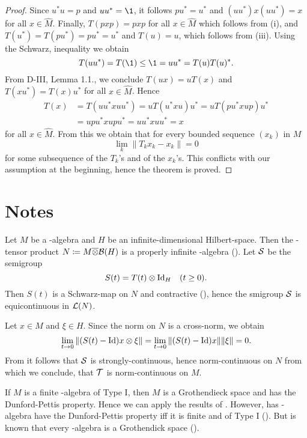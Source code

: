 \begin{proof}
Since $u^{*}u = p$ and $uu^{*} = \1$, it follows $pu^{*} = u^{*}$ and $(uu^{*})x(uu^{*}) = x$ for all $x \in \widehat{M}$.
Finally, $T(pxp) = pxp$ for all $x \in \widehat{M}$ which follows from (i), and $T(u^{*}) = T(pu^{*}) = pu^{*} = u^{*}$ and $T(u) = u$, which follows from (iii).
Using the Schwarz, inequality we obtain
\[
	T(uu^{*}) = T(\1) \leq \1 = uu^{*} = T(u)T(u)^{*}.
\]
From D-III, Lemma 1.1., we conclude $T(ux) = uT(x)$ and $T(xu^{*}) = T(x)u^{*}$ for all $x \in \widehat{M}$.
Hence
\begin{align*}
T(x) &= T(uu^{*}xuu^{*}) = uT(u^{*}xu)u^{*} = uT(pu^{*}xup)u^{*} \\
&= upu^{*}xupu^{*} = uu^{*}xuu^{*} = x
\end{align*}
for all $x \in \widehat{M}$.
From this we obtain that for every bounded sequence $(x_{k})$ in $M$
\[
	\lim_k \|T_k x_{k} - x_{k}\| = 0
\]
for some subsequence of the $T_{k}$'s and of the $x_{k}$'s.
This conflicts with our assumption at the beginning, hence the theorem is proved.
\end{proof}

\section*{Notes}
Let $ M $ be a \WA-algebra and $ H $ be an infinite-dimensional Hilbert-space. 
Then the \WA-tensor product $ N \coloneq M \overline{\otimes} \mathcal{B}(H) $ is a properly infinite \WA-algebra (\citet[Thm. 2.6.6]{sakai:1971}).
Let $ \mathcal{S} $ be the semigroup 
%
\[
	S(t) = T(t) \otimes \operatorname{\operatorname{Id}}_{H} \quad (t \geq 0). 
\]
%
Then $ S(t) $ is a Schwarz-map on $ N $ and contractive (\citet[Prop. IV.5.13.]{takesaki:1979}), hence the smigroup $ \mathcal{S} $ is equicontinuous in $ \mathcal{L}(N) $.

Let $ x \in M $ and $  \xi \in H$.
Since the norm on $ N $ is a cross-norm, we obtain
%
\[
	\lim_{t \to 0} \| ( S(t) - \operatorname{\operatorname{Id}} ) x \otimes \xi \| =
	\lim_{t \to 0} \| ( S(t) - \operatorname{\operatorname{Id}} ) x \| \| \xi \| = 0.
\]
%
From \citet[III.4.5]{schaefer:1966} it follows that $ \mathcal{S} $ is strongly-continuous, hence norm-continuous on $ N $ from which we conclude, that $ \mathcal{T} $ is norm-continuous on $ M $.
\begin{remark}
If $ M $ is a finite \WA-algebra of Type I, then $ M $ is a Grothendieck space and has the Dunford-Pettis property. 
Hence we can apply the results of \citet{lotz:1985}.
However, has \WA-algebra have the Dunford-Pettis property iff it is finite and of Type I (\citet{chu:1990}).
But is known that every \WA-algebra is a Grothendick space (\citet{pfitzner:1994}).
\end{remark}



